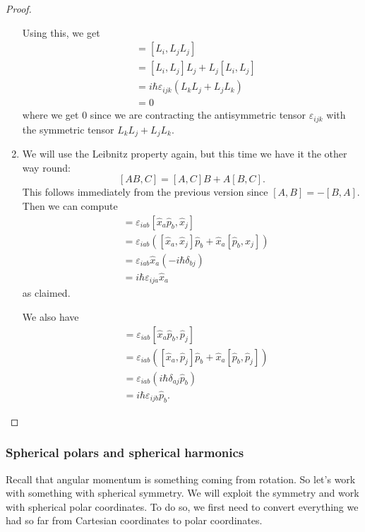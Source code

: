 \documentclass[a4paper]{article}
\begin{document}
\begin{proof}
\begin{enumerate}
      Using this, we get
      \begin{align*}
        [L_i, \mathbf{L}^2] &= [L_i, L_j L_j]\\
        &= [L_i, L_j] L_j + L_j [L_i, L_j]\\
        &= i\hbar \varepsilon_{ijk} (L_k L_j + L_j L_k)\\
        &= 0
      \end{align*}
      where we get $0$ since we are contracting the antisymmetric tensor $\varepsilon_{ijk}$ with the symmetric tensor $L_k L_j + L_j L_k$.
    \item We will use the Leibnitz property again, but this time we have it the other way round:
      \[
        [AB, C] = [A, C]B + A[B, C].
      \]
      This follows immediately from the previous version since $[A, B] = -[B, A]$. Then we can compute
      \begin{align*}
        [L_i, \hat{x}_j] &= \varepsilon_{iab} [\hat{x}_a \hat{p}_b, \hat{x}_j]\\
        &= \varepsilon_{iab} ([\hat{x}_a, \hat{x}_j] \hat{p}_b + \hat{x}_a [\hat{p}_b, \hat{x}_j])\\
        &= \varepsilon_{iab} \hat{x}_a (-i\hbar \delta_{bj})\\
        &= i\hbar \varepsilon_{ija} \hat{x}_a
      \end{align*}
      as claimed.

      We also have
      \begin{align*}
        [L_i, \hat{p}_j] &= \varepsilon_{iab} [\hat{x}_a \hat{p}_b, \hat{p}_j]\\
        &= \varepsilon_{iab} ([\hat{x}_a, \hat{p}_j] \hat{p}_b + \hat{x}_a [\hat{p}_b, \hat{p}_j])\\
        &= \varepsilon_{iab} (i\hbar \delta_{aj} \hat{p}_b)\\
        &= i\hbar \varepsilon_{ijb} \hat{p}_b.
      \end{align*}
  \end{enumerate}
\end{proof}
\subsubsection*{Spherical polars and spherical harmonics}
Recall that angular momentum is something coming from rotation. So let's work with something with spherical symmetry. We will exploit the symmetry and work with spherical polar coordinates. To do so, we first need to convert everything we had so far from Cartesian coordinates to polar coordinates.
\end{document}
